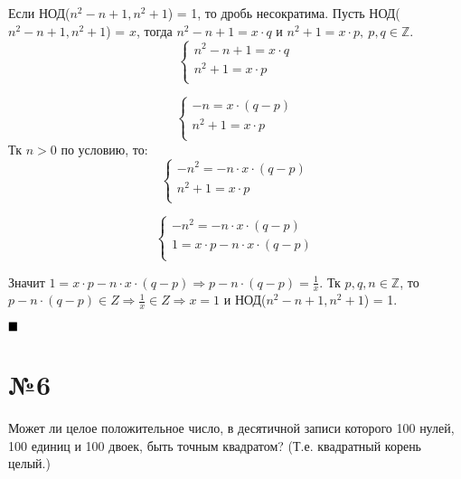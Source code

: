 \documentclass[a4paper, 16pt]{article}
\newcommand{\Z} {\mathbb{Z}}
\newenvironment{proof}[1][Доказательство]{%
	\begin{trivlist}
		\item[\hskip \labelsep {\bfseries #1:}]
		\item \hspace{14pt}
	}{
		$ \hfill\blacksquare $
	\end{trivlist}
	\hfill\break
}
\begin{document}
		\begin{proof}
			Если  НОД($n^2 - n+1,{n^2+1}$) = 1, то дробь несократима. Пусть НОД($n^2 - n+1,{n^2+1}$) = $x$, тогда $n^2 - n + 1 = x \cdot q$ и $n^2 + 1 = x \cdot p, \ p, q \in \Z$. 
			\begin{equation*}
				\begin{cases}
					n^2 - n + 1 = x \cdot q \\
					n^2 + 1 = x \cdot p \\ 
				\end{cases}
			\end{equation*}
		
		\begin{equation*}
			\begin{cases}
				- n = x \cdot (q - p) \\
				n^2 + 1 = x \cdot p \\ 
			\end{cases}
		\end{equation*}
			Тк $n > 0$ по условию, то:
		\begin{equation*}
			\begin{cases}
				-n^2 = -n \cdot x \cdot (q - p) \\
				n^2 + 1 = x \cdot p \\ 
			\end{cases}
		\end{equation*}

		\begin{equation*}
			\begin{cases}
				-n^2 = -n \cdot x \cdot (q - p) \\
				1 = x \cdot p  -n \cdot x \cdot (q - p)\\ 
			\end{cases}
		\end{equation*}
	
		Значит $1 = x \cdot p  -n \cdot x \cdot (q - p) \Rightarrow p - n  \cdot (q - p) = \frac{1}{x}$. Тк $p, q, n \in \Z$, то $p - n  \cdot (q - p) \in Z \Rightarrow \frac{1}{x} \in Z \Rightarrow x = 1$ и  НОД($n^2 - n+1,{n^2+1}$) = 1.
		
		\end{proof}
	
	\section*{№6}
	
		Может ли целое положительное число, в десятичной записи которого 100 нулей, 100 единиц и 100
		двоек, быть точным квадратом? (Т.е. квадратный корень целый.)
		
\end{document}
